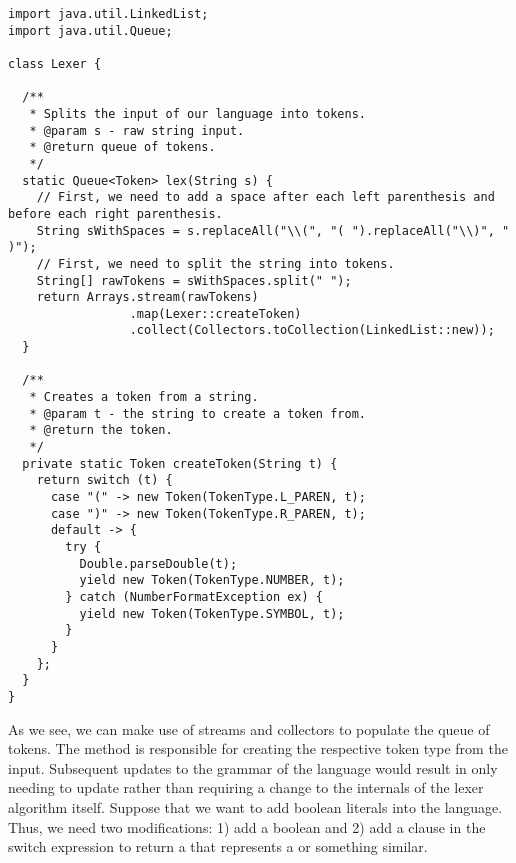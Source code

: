 \begin{lstlisting}[language=MyJava]
import java.util.LinkedList;
import java.util.Queue;

class Lexer {

  /**
   * Splits the input of our language into tokens.
   * @param s - raw string input.
   * @return queue of tokens.
   */
  static Queue<Token> lex(String s) {
    // First, we need to add a space after each left parenthesis and before each right parenthesis.
    String sWithSpaces = s.replaceAll("\\(", "( ").replaceAll("\\)", " )");
    // First, we need to split the string into tokens.
    String[] rawTokens = sWithSpaces.split(" ");
    return Arrays.stream(rawTokens)
                 .map(Lexer::createToken)
                 .collect(Collectors.toCollection(LinkedList::new));
  }

  /**
   * Creates a token from a string.
   * @param t - the string to create a token from.
   * @return the token.
   */
  private static Token createToken(String t) {
    return switch (t) {
      case "(" -> new Token(TokenType.L_PAREN, t);
      case ")" -> new Token(TokenType.R_PAREN, t);
      default -> {
        try {
          Double.parseDouble(t);
          yield new Token(TokenType.NUMBER, t);
        } catch (NumberFormatException ex) {
          yield new Token(TokenType.SYMBOL, t);
        }
      }
    };
  }
}
\end{lstlisting}

As we see, we can make use of streams and collectors to populate the queue of tokens. The  method is responsible for creating the respective token type from the input. Subsequent updates to the grammar of the language would result in only needing to update  rather than requiring a change to the internals of the lexer algorithm itself. Suppose that we want to add boolean literals into the language. Thus, we need two modifications: 1) add a boolean  and 2) add a clause in the switch expression to return a  that represents a  or something similar.


